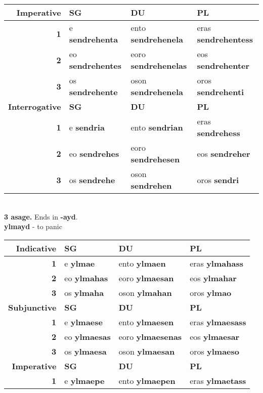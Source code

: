 \begin{center}
\begin{tabular}{|r|l|l|l|}
    \textbf{Imperative} & \textbf{SG} & \textbf{DU} & \textbf{PL} \\ \hline
    \textbf{1} & e \textbf{sendrehenta} & ento \textbf{sendrehenela} & eras \textbf{sendrehentess} \\ \hline
    \textbf{2} & eo \textbf{sendrehentes} & eoro \textbf{sendrehenelas} & eos \textbf{sendrehenter} \\ \hline
    \textbf{3} & os \textbf{sendrehente} & oson \textbf{sendrehenela} & oros \textbf{sendrehenti} \\ \hline
    \textbf{Interrogative} & \textbf{SG} & \textbf{DU} & \textbf{PL} \\ \hline
    \textbf{1} & e \textbf{sendria} & ento \textbf{sendrian} & eras \textbf{sendrehess} \\ \hline
    \textbf{2} & eo \textbf{sendrehes} & eoro \textbf{sendrehesen} & eos \textbf{sendreher} \\ \hline
    \textbf{3} & os \textbf{sendrehe} & oson \textbf{sendrehen} & oros \textbf{sendri} \\ \hline
  \end{tabular} \\
  \textbf{3 asage.} Ends in \textbf{-ayd}. \\
  \textbf{ylmayd} - to panic \\
  \begin{tabular}{|r|l|l|l|}
    \hline
    \textbf{Indicative} & \textbf{SG} & \textbf{DU} & \textbf{PL} \\ \hline
    \textbf{1} & e \textbf{ylmae} & ento \textbf{ylmaen} & eras \textbf{ylmahass} \\ \hline
    \textbf{2} & eo \textbf{ylmahas} & eoro \textbf{ylmaesan} & eos \textbf{ylmahar} \\ \hline
    \textbf{3} & os \textbf{ylmaha} & oson \textbf{ylmahan} & oros \textbf{ylmao} \\ \hline
    \textbf{Subjunctive} & \textbf{SG} & \textbf{DU} & \textbf{PL} \\ \hline
    \textbf{1} & e \textbf{ylmaese} & ento \textbf{ylmaesen} & eras \textbf{ylmaesass} \\ \hline
    \textbf{2} & eo \textbf{ylmaesas} & eoro \textbf{ylmaesenas} & eos \textbf{ylmaesar} \\ \hline
    \textbf{3} & os \textbf{ylmaesa} & oson \textbf{ylmaesan} & oros \textbf{ylmaeso} \\ \hline
    \textbf{Imperative} & \textbf{SG} & \textbf{DU} & \textbf{PL} \\ \hline
    \textbf{1} & e \textbf{ylmaepe} & ento \textbf{ylmaepen} & eras \textbf{ylmaetass} \\ \hline

\end{tabular}
\end{center}

